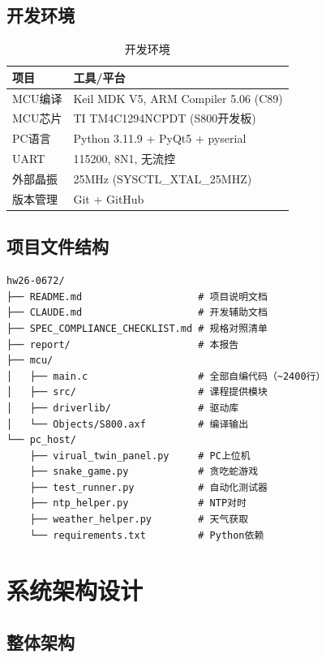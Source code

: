 \documentclass[12pt,hyperref,a4paper,UTF8]{ctexart}
\begin{document}
\subsection{开发环境}

\begin{table}[!htbp]
    \centering
    \begin{tabular}{l|l}
    \hline
    \textbf{项目} & \textbf{工具/平台} \\
    \hline
    MCU编译 & Keil MDK V5, ARM Compiler 5.06 (C89) \\
    MCU芯片 & TI TM4C1294NCPDT (S800开发板) \\
    PC语言 & Python 3.11.9 + PyQt5 + pyserial \\
    UART & 115200, 8N1, 无流控 \\
    外部晶振 & 25MHz (SYSCTL\_XTAL\_25MHZ) \\
    版本管理 & Git + GitHub \\
    \hline
    \end{tabular}
    \caption{开发环境}
\end{table}

\subsection{项目文件结构}

\begin{verbatim}
hw26-0672/
├── README.md                    # 项目说明文档
├── CLAUDE.md                    # 开发辅助文档
├── SPEC_COMPLIANCE_CHECKLIST.md # 规格对照清单
├── report/                      # 本报告
├── mcu/
│   ├── main.c                   # 全部自编代码（~2400行）
│   ├── src/                     # 课程提供模块
│   ├── driverlib/               # 驱动库
│   └── Objects/S800.axf         # 编译输出
└── pc_host/
    ├── virual_twin_panel.py     # PC上位机
    ├── snake_game.py            # 贪吃蛇游戏
    ├── test_runner.py           # 自动化测试器
    ├── ntp_helper.py            # NTP对时
    ├── weather_helper.py        # 天气获取
    └── requirements.txt         # Python依赖
\end{verbatim}

\section{系统架构设计}

\subsection{整体架构}
\end{document}
